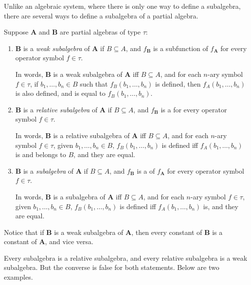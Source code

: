 \documentclass[12pt]{article}
\begin{document}
Unlike an algebraic system, where there is only one way to define a subalgebra, there are several ways to define a subalgebra of a partial algebra.  

Suppose $\boldsymbol{A}$ and $\boldsymbol{B}$ are partial algebras of type $\tau$:
\begin{enumerate}
\item $\boldsymbol{B}$ is a \emph{weak subalgebra} of $\boldsymbol{A}$ if $B\subseteq A$, and $f_{\boldsymbol{B}}$ is a subfunction of $f_{\boldsymbol{A}}$ for every operator symbol $f\in \tau$.

In words, $\boldsymbol{B}$ is a weak subalgebra of $\boldsymbol{A}$ iff $B\subseteq A$, and for each $n$-ary symbol $f\in \tau$, if $b_1,\ldots, b_n \in B$ such that $f_B(b_1,\ldots, b_n)$ is defined, then $f_A(b_1,\ldots, b_n)$ is also defined, and is equal to $f_B(b_1, \ldots, b_n)$.
\item $\boldsymbol{B}$ is a \emph{relative subalgebra} of $\boldsymbol{A}$ if $B\subseteq A$, and $f_{\boldsymbol{B}}$ is a  for every operator symbol $f\in \tau$.

In words, $\boldsymbol{B}$ is a relative subalgebra of $\boldsymbol{A}$ iff $B\subseteq A$, and for each $n$-ary symbol $f\in \tau$, given $b_1,\ldots, b_n \in B$, $f_B(b_1,\ldots, b_n)$ is defined iff $f_A(b_1,\ldots, b_n)$ is and belongs to $B$, and they are equal.
\item $\boldsymbol{B}$ is a \emph{subalgebra} of $\boldsymbol{A}$ if $B\subseteq A$, and $f_{\boldsymbol{B}}$ is a  of $f_{\boldsymbol{A}}$ for every operator symbol $f\in \tau$.

In words, $\boldsymbol{B}$ is a subalgebra of $\boldsymbol{A}$ iff $B\subseteq A$, and for each $n$-ary symbol $f\in \tau$, given $b_1,\ldots, b_n \in B$, $f_B(b_1,\ldots, b_n)$ is defined iff $f_A(b_1,\ldots, b_n)$ is, and they are equal.
\end{enumerate}

Notice that if $\boldsymbol{B}$ is a weak subalgebra of $\boldsymbol{A}$, then every constant of $\boldsymbol{B}$ is  a constant of $\boldsymbol{A}$, and vice versa.

Every subalgebra is a relative subalgebra, and every relative subalgebra is a weak subalgebra.  But the converse is false for both statements.  Below are two examples.
\end{document}
